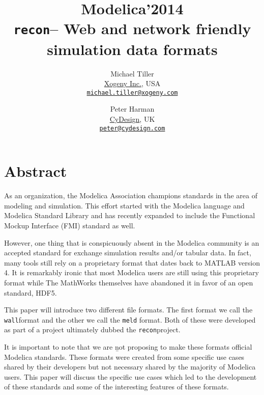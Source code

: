 \documentclass[11pt,a4paper,twocolumn]{article}
\newcommand{\recon}{\texttt{recon}}
\newcommand{\wall}{\texttt{wall}}
\newcommand{\meld}{\texttt{meld}}
\begin{document}
\title{\textbf{{\small Modelica'2014}\\
    \recon -- Web and network friendly simulation data formats}}

\author{Michael Tiller\\
  \href{http://xogeny.com}{Xogeny Inc.}, USA\\
  \href{mailto:michael.tiller@xogeny.com}
       {\nolinkurl{michael.tiller@xogeny.com}}
  \and Peter Harman\\
  \href{http://www.cydesign.com}
       {CyDesign}, UK\\
  \href{mailto:peter@cydesign.com}{\nolinkurl{peter@cydesign.com}}}
\date{} %
\maketitle\thispagestyle{empty} %

\section*{Abstract}

As an organization, the Modelica Association champions standards in
the area of modeling and simulation.  This effort started with the
Modelica language \cite{ModSpec} and Modelica Standard
Library\cite{MSL} and has recently expanded to include the Functional
Mockup Interface (FMI) standard \cite{FMI} as well.

However, one thing that is conspicuously absent in the Modelica
community is an accepted standard for exchange simulation results
and/or tabular data.  In fact, many tools still rely on a proprietary
format that dates back to MATLAB version 4.  It is remarkably ironic
that most Modelica users are still using this proprietary format while
The MathWorks themselves have abandoned it in favor of an open
standard, HDF5\cite{HDF5}.

This paper will introduce two different file formats.  The first
format we call the \wall format and the other we call the \meld
format.  Both of these were developed as part of a project ultimately
dubbed the \recon project.

It is important to note that we are {\b not} proposing to make these
formats official Modelica standards.  These formats were created from
some specific use cases shared by their developers but not necessary
shared by the majority of Modelica users.  This paper will discuss the
specific use cases which led to the development of these standards and
some of the interesting features of these formats.
\end{document}
